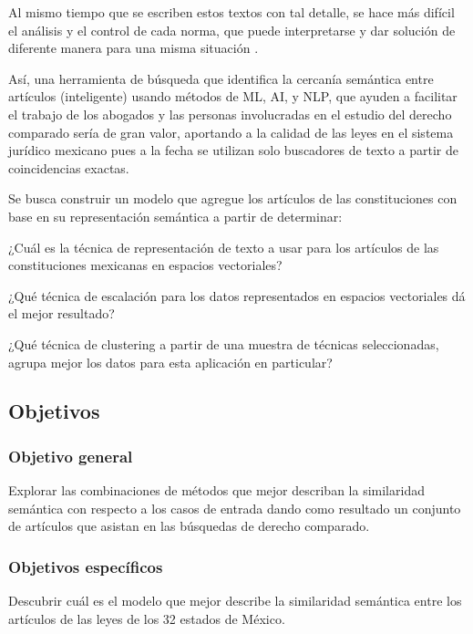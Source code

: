 \documentclass[12pt]{article}
\begin{document}
		
		
		Al mismo tiempo que se escriben estos textos con tal detalle, se hace más difícil el análisis y el control de cada norma, que puede interpretarse y dar solución de diferente manera para una misma situación \cite{Risco2017}.
		
		Así, una herramienta de búsqueda que identifica la cercanía semántica entre artículos (inteligente) usando métodos de ML, AI, y NLP, que ayuden a facilitar el trabajo de los abogados y las personas involucradas en el estudio del derecho comparado sería de gran valor, aportando a la calidad de las leyes en el sistema jurídico mexicano pues a la fecha se utilizan solo buscadores de texto a partir de coincidencias exactas.
		
		Se busca construir un modelo que agregue los artículos de las constituciones con base en su representación semántica a partir de determinar:
		
		¿Cuál es la técnica de representación de texto a usar para los artículos de las constituciones mexicanas en espacios vectoriales?
		
		¿Qué técnica de escalación para los datos representados en espacios vectoriales dá el mejor resultado?
		
		
		¿Qué técnica de clustering a partir de una muestra de técnicas seleccionadas, agrupa mejor los datos para esta aplicación en particular?
		
		\subsection{Objetivos}
			\subsubsection{Objetivo general}
			Explorar las combinaciones de métodos que mejor describan la similaridad semántica con respecto a los casos de entrada dando como resultado un conjunto de artículos que asistan en las búsquedas de derecho comparado.
			
			
			\subsubsection{Objetivos específicos}
			Descubrir cuál es el modelo que mejor describe la similaridad semántica entre los artículos de las leyes de los 32 estados de México.
			
\end{document}

